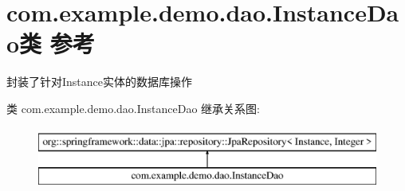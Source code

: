 \hypertarget{interfacecom_1_1example_1_1demo_1_1dao_1_1_instance_dao}{}\section{com.\+example.\+demo.\+dao.\+Instance\+Dao类 参考}
\label{interfacecom_1_1example_1_1demo_1_1dao_1_1_instance_dao}


封装了针对\+Instance实体的数据库操作  


类 com.\+example.\+demo.\+dao.\+Instance\+Dao 继承关系图\+:\begin{figure}[H]
\begin{center}
\leavevmode
\includegraphics[height=2.000000cm]{interfacecom_1_1example_1_1demo_1_1dao_1_1_instance_dao}
\end{center}
\end{figure}
